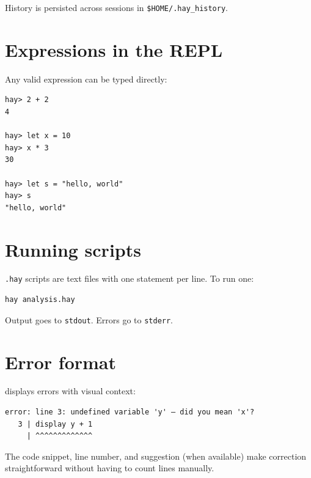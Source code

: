 History is persisted across sessions in \texttt{\$HOME/.hay\_history}.

\section{Expressions in the REPL}

Any valid expression can be typed directly:

\begin{lstlisting}[caption={Basic interactive session}]
hay> 2 + 2
4

hay> let x = 10
hay> x * 3
30

hay> let s = "hello, world"
hay> s
"hello, world"
\end{lstlisting}

\section{Running scripts}

\texttt{.hay} scripts are text files with one statement per line.
To run one:

\begin{lstlisting}[style=inline, language=sh]
hay analysis.hay
\end{lstlisting}

Output goes to \texttt{stdout}. Errors go to \texttt{stderr}.

\section{Error format}

\hayashi{} displays errors with visual context:

\begin{lstlisting}[style=inline]
error: line 3: undefined variable 'y' — did you mean 'x'?
   3 | display y + 1
     | ^^^^^^^^^^^^^
\end{lstlisting}

The code snippet, line number, and suggestion (when available) make
correction straightforward without having to count lines manually.

